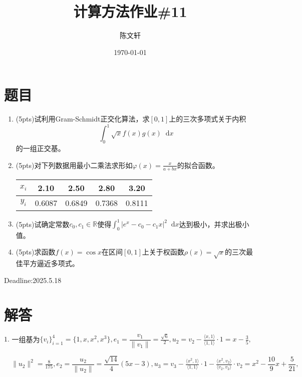 \documentclass[cn,hazy,green,11pt,normal]{elegantnote}
\title{计算方法作业\#11}
\author{陈文轩}
\institute{KFRC}
\date{\today}
\newcommand*{\diff}{\mathop{}\!\mathrm{d}}
\begin{document}
\maketitle

\section{题目}


\begin{enumerate}

    \item (5pts)试利用Gram-Schmidt正交化算法，求$[0,1]$上的三次多项式关于内积\[\int_0^1\sqrt{x}f(x)g(x)\diff x\]的一组正交基。

    \item (5pts)对下列数据用最小二乘法求形如$\varphi(x)=\frac{x}{a+bx}$的拟合函数。

        \begin{table}[H]
            \centering
            \begin{tabular}{|c|c|c|c|c|}
                \hline
                $x_i$ & 2.10 & 2.50 & 2.80 & 3.20 \\
                \hline
                $y_i$ & 0.6087 & 0.6849 & 0.7368 & 0.8111 \\
                \hline
            \end{tabular}
            \label{tab:1}
        \end{table}

    \item (5pts)试确定常数$c_0,c_1\in\mathbb{R}$使得$\int_0^1| e^x-c_0-c_1 x|^2\diff x$达到极小，并求出极小值。

    \item (5pts)求函数$f(x)=\cos x$在区间$[0,1]$上关于权函数$\rho(x)=\sqrt{x}$的三次最佳平方逼近多项式。
\end{enumerate}

    Deadline:2025.5.18

\section{解答}

    $1.\,\,$一组基为$\{v_i\}_{i=1}^4=\{1,x,x^2,x^3\},e_1=\dfrac{v_1}{\|v_1\|}=\frac{\sqrt{6}}{2},u_2=v_2-\frac{\langle x,1 \rangle}{\langle 1,1 \rangle}\cdot 1=x-\frac35,$

    $\quad\|u_2\|^2=\frac8{175},e_2=\dfrac{u_2}{\|u_2\|}=\dfrac{\sqrt{14}}{4}(5x-3),u_3=v_3-\frac{\langle x^2,1 \rangle}{\langle 1,1 \rangle}\cdot 1-\frac{\langle x^2,v_2 \rangle}{\langle v_2,v_2 \rangle}\cdot v_2=x^2-\dfrac{10}9x+\dfrac{5}{21},$
\end{document}
